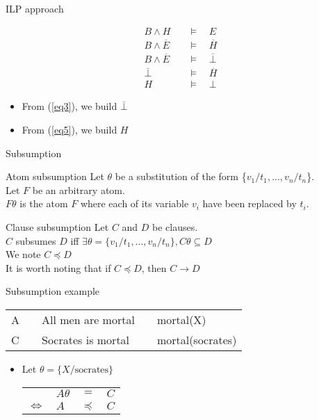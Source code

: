 
\begin{frame}{ILP approach}

\begin{align}
B \land H \quad &\models \quad E \label{eq1} \\
B \land \overline{E} \quad &\models \quad \overline{H} \label{eq2} \\
B \land \overline{E} \quad &\models \quad \overline{\bot} \label{eq3} \\
\overline{\bot} \quad &\models \quad \overline{H} \label{eq4} \\
H \quad &\models \quad \bot \label{eq5}
\end{align}

\begin{itemize}
    \item From (\ref{eq3}), we build $\overline{\bot}$
    \item From (\ref{eq5}), we build $H$
\end{itemize}

\end{frame}

\begin{frame}{Subsumption}
\vfill
\begin{block}{Atom subsumption}
Let $\theta$ be a substitution of the form \{$v_1/t_1, ..., v_n/t_n$\}. \\
Let $F$ be an arbitrary atom. \\
$F\theta$ is the atom $F$ where each of its variable $v_i$ have been replaced by $t_i$.
\end{block}
\vfill
\begin{block}{Clause subsumption}
Let $C$ and $D$ be clauses. \\
$C$ subsumes $D$ iff $\exists \theta = \{v_1/t_1, ..., v_n/t_n\}, C\theta \subseteq D$ \\
We note $C \preceq D$ \\
It is worth noting that if $C \preceq D$, then $C \rightarrow D$
\end{block}    
\vfill
\end{frame}

\begin{frame}{Subsumption example}
\vfill
\begin{center}
\begin{tabular}{lllll}
    A & & All men are mortal & & mortal(X) \\
    C & & Socrates is mortal & & mortal(socrates) \\
\end{tabular}
\end{center}    
\vfill
\begin{itemize}
\item Let $\theta = \{X/\text{socrates}\}$
\begin{center}
\begin{tabular}{llll}
&$A\theta$&$=$&$C$\\
$\Leftrightarrow$&$A$&$\preceq$&$C$
\end{tabular}    
\end{center}
\vfill
\end{itemize}
\end{frame}



